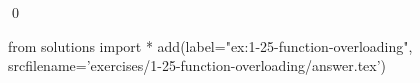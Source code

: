 
\begin{ex}
  \label{ex:1-25-function-overloading}
  
  \qed
\end{ex}
\begin{python0}
from solutions import *
add(label="ex:1-25-function-overloading",
    srcfilename='exercises/1-25-function-overloading/answer.tex')
\end{python0}
